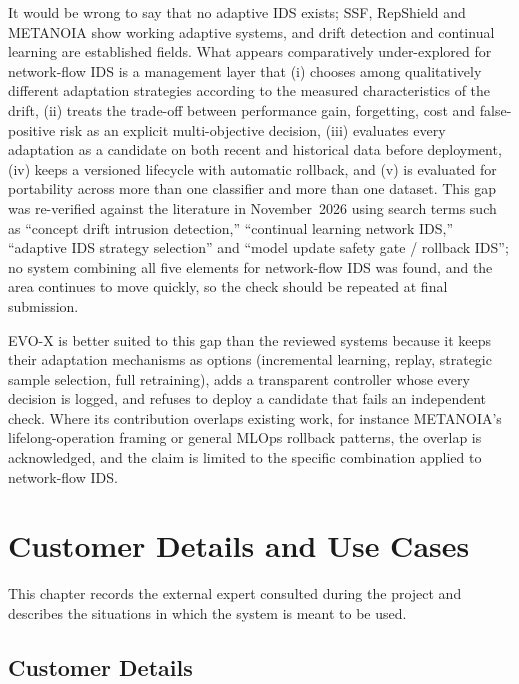 \documentclass{article}
\begin{document}
It would be wrong to say that no adaptive IDS exists; SSF, RepShield and METANOIA show working adaptive systems, and drift detection and continual learning are established fields. What appears comparatively under-explored for network-flow IDS is a management layer that (i) chooses among qualitatively different adaptation strategies according to the measured characteristics of the drift, (ii) treats the trade-off between performance gain, forgetting, cost and false-positive risk as an explicit multi-objective decision, (iii) evaluates every adaptation as a candidate on both recent and historical data before deployment, (iv) keeps a versioned lifecycle with automatic rollback, and (v) is evaluated for portability across more than one classifier and more than one dataset. This gap was re-verified against the literature in November~2026 using search terms such as ``concept drift intrusion detection,'' ``continual learning network IDS,'' ``adaptive IDS strategy selection'' and ``model update safety gate / rollback IDS''; no system combining all five elements for network-flow IDS was found, and the area continues to move quickly, so the check should be repeated at final submission.

EVO-X is better suited to this gap than the reviewed systems because it keeps their adaptation mechanisms as options (incremental learning, replay, strategic sample selection, full retraining), adds a transparent controller whose every decision is logged, and refuses to deploy a candidate that fails an independent check. Where its contribution overlaps existing work, for instance METANOIA's lifelong-operation framing or general MLOps rollback patterns, the overlap is acknowledged, and the claim is limited to the specific combination applied to network-flow IDS.

    \pagebreak
    \section{Customer Details and Use Cases}

This chapter records the external expert consulted during the project and describes the situations in which the system is meant to be used.

\subsection{Customer Details}
\end{document}
